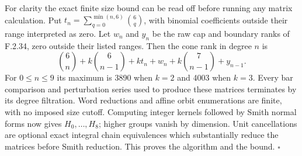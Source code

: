 For clarity the exact finite size bound can be read off
before running any matrix calculation.  Put
$t_n=\sum_{q=0}^{\min(n,6)}\binom6q$, with binomial
coefficients outside their range interpreted as zero.
Let $w_n$ and $y_n$ be the raw cap and boundary ranks of
F.2.34, zero outside their listed ranges.  Then the cone rank
in degree $n$ is
\[
 \binom6n+k\binom6{n-1}+k t_n+w_n+
 k\binom7{n-1}+y_{n-1}.                                 \tag{F.GC9}
\]
For $0\leq n\leq9$ its maximum is 3890 when $k=2$ and
4003 when $k=3$.  Every bar comparison and perturbation
series used to produce these matrices terminates by its
degree filtration.  Word reductions and affine orbit
enumerations are finite, with no imposed size cutoff.
Computing integer kernels followed by Smith normal forms
now gives $H_0,\ldots,H_8$; higher groups vanish by dimension.
Unit cancellations are optional exact integral chain
equivalences which substantially reduce the matrices before
Smith reduction.  This proves the algorithm and the bound.
\hfill$\square$

